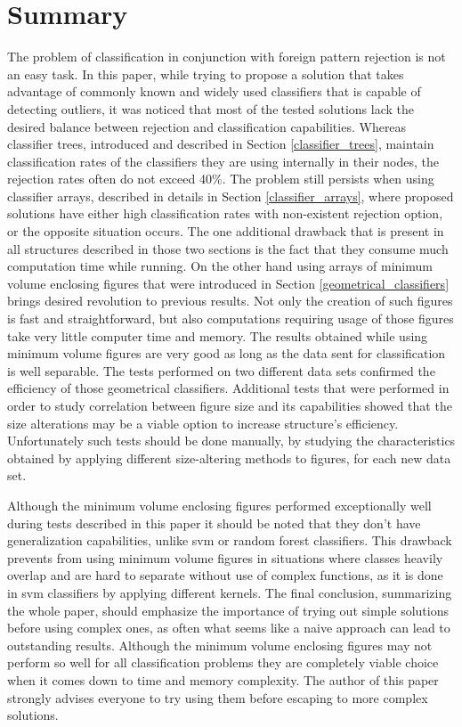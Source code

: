 \chapter{Summary}

The problem of classification in conjunction with foreign pattern rejection is not an easy task. In this paper, while trying to propose a solution that takes advantage of commonly known and widely used classifiers that is capable of detecting outliers, it was noticed that most of the tested solutions lack the desired balance between rejection and classification capabilities. Whereas classifier trees, introduced and described in Section \ref{classifier_trees}, maintain classification rates of the classifiers they are using internally in their nodes, the rejection rates often do not exceed 40\%. The problem still persists when using classifier arrays, described in details in Section \ref{classifier_arrays}, where proposed solutions have either high classification rates with non-existent rejection option, or the opposite situation occurs. The one additional drawback that is present in all structures described in those two sections is the fact that they consume much computation time while running. On the other hand using arrays of minimum volume enclosing figures that were introduced in Section \ref{geometrical_classifiers} brings desired revolution to previous results. Not only the creation of such figures is fast and straightforward, but also computations requiring usage of those figures take very little computer time and memory. The results obtained while using minimum volume figures are very good as long as the data sent for classification is well separable. The tests performed on two different data sets confirmed the efficiency of those geometrical classifiers. Additional tests that were performed in order to study correlation between figure size and its capabilities showed that the size alterations may be a viable option to increase structure's efficiency. Unfortunately such tests should be done manually, by studying the characteristics obtained by applying different size-altering methods to figures, for each new data set.

Although the minimum volume enclosing figures performed exceptionally well during tests described in this paper it should be noted that they don't have generalization capabilities, unlike svm or random forest classifiers. This drawback prevents from using minimum volume figures in situations where classes heavily overlap and are hard to separate without use of complex functions, as it is done in svm classifiers by applying different kernels. The final conclusion, summarizing the whole paper, should emphasize the importance of trying out simple solutions before using complex ones, as often what seems like a naive approach can lead to outstanding results. Although the minimum volume enclosing figures may not perform so well for all classification problems they are completely viable choice when it comes down to time and memory complexity. The author of this paper strongly advises everyone to try using them before escaping to more complex solutions.